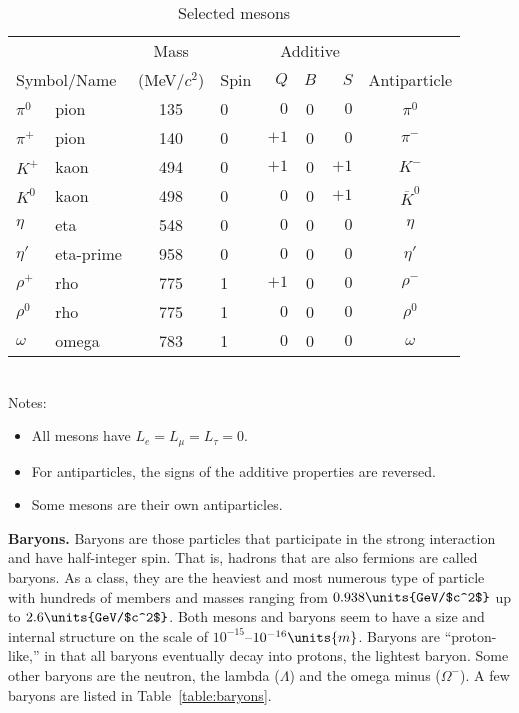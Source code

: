 \begin{table}[tbph]
\caption{Selected mesons}
\label{table:mesons}
\begin{tabular}[tbp]{llclrcrc}
&& Mass && \multicolumn{3}{|c|}{Additive}& \\
\multicolumn{2}{l}{Symbol/Name} & (MeV/$c^2$) & Spin\hspace{4mm} & \multicolumn{1}{|r}{$Q$}
 & $B$ & \multicolumn{1}{r|}{$S$} & Antiparticle \\
\hline\hline
$\pi^0$  & pion      & 135   & 0 & $ 0$ & 0 & $0$  & $\pi^0$ \\[0.5ex]
$\pi^+$  & pion      & 140   & 0 & $+1$ & 0 & $0$  & $\pi^-$ \\
$K^+$    & kaon      & 494   & 0 & $+1$ & 0 & $+1$ & $K^-$   \\
$K^0$    & kaon      & 498   & 0 & $ 0$ & 0 & $+1$ & $\overline K^0$\\[0.5ex]
$\eta$   & eta       & 548   & 0 & $ 0$ & 0 & $ 0$ & $\eta$  \\
$\eta'$  & eta-prime & 958   & 0 & $ 0$ & 0 & $ 0$ & $\eta'$ \\[0.5ex]
$\rho^+$ & rho       & 775   & 1 & $+1$ & 0 & $ 0$ & $\rho^-$\\
$\rho^0$ & rho       & 775   & 1 & $ 0$ & 0 & $ 0$ & $\rho^0$\\
$\omega$ & omega     & 783   & 1 & $ 0$ & 0 & $ 0$ & $\omega$\\
\hline
\end{tabular}\\[0.5ex]
Notes:
\begin{itemize}
\item All mesons have $L_e=L_\mu=L_\tau = 0$.
\item For antiparticles, the signs of the additive properties are reversed.
\item Some mesons are their own antiparticles.
\end{itemize}
\end{table}

{\bf Baryons.}  Baryons are those particles that participate in the
strong interaction and have half-integer spin.  That is, hadrons that
are also fermions are called baryons.  As a class, they are the heaviest
and most numerous type of particle with hundreds of members and masses
ranging from $0.938\units{GeV/$c^2$}$ up to $2.6\units{GeV/$c^2$}$.
Both mesons and baryons seem to have a size and internal structure
on the scale of $10^{-15}$--$10^{-16}\units{m}$.  Baryons are
``proton-like,'' in that all baryons eventually decay into protons,
the lightest baryon.  Some other baryons are the neutron, the lambda
($\Lambda$) and the omega minus ($\Omega^-$).  A few baryons are listed
in Table~\ref{table:baryons}.

